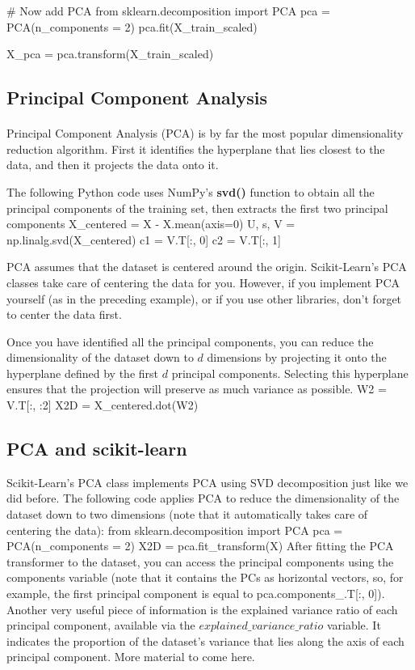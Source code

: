 \documentclass[%
oneside,                 %
final,                   %
10pt]{article}
\begin{document}
\bpycod
# Now add PCA
from sklearn.decomposition import PCA
pca = PCA(n_components = 2)
pca.fit(X_train_scaled)

X_pca = pca.transform(X_train_scaled)
\epycod



\subsection{Principal Component Analysis}

\paragraph{}
Principal Component Analysis (PCA) is by far the most popular dimensionality reduction algorithm.
First it identifies the hyperplane that lies closest to the data, and then it projects the data onto it.

The following Python code uses NumPy’s \textbf{svd()} function to obtain all the principal components of the
training set, then extracts the first two principal components
\bpycod
X_centered = X - X.mean(axis=0)
U, s, V = np.linalg.svd(X_centered)
c1 = V.T[:, 0]
c2 = V.T[:, 1]
\epycod

PCA assumes that the dataset is centered around the origin. Scikit-Learn’s PCA classes take care of centering
the data for you. However, if you implement PCA yourself (as in the preceding example), or if you use other libraries, don’t
forget to center the data first.

Once you have identified all the principal components, you can reduce the dimensionality of the dataset
down to $d$ dimensions by projecting it onto the hyperplane defined by the first $d$ principal components.
Selecting this hyperplane ensures that the projection will preserve as much variance as possible. 
\bpycod
W2 = V.T[:, :2]
X2D = X_centered.dot(W2)
\epycod

\subsection{PCA and scikit-learn}

Scikit-Learn’s PCA class implements PCA using SVD decomposition just like we did before. The
following code applies PCA to reduce the dimensionality of the dataset down to two dimensions (note
that it automatically takes care of centering the data):
\bpycod
from sklearn.decomposition import PCA
pca = PCA(n_components = 2)
X2D = pca.fit_transform(X)
\epycod
After fitting the PCA transformer to the dataset, you can access the principal components using the
components variable (note that it contains the PCs as horizontal vectors, so, for example, the first
principal component is equal to 
\bpycod
pca.components_.T[:, 0]).
\epycod
Another very useful piece of information is the explained variance ratio of each principal component,
available via the $explained\_variance\_ratio$ variable. It indicates the proportion of the dataset’s
variance that lies along the axis of each principal component. 
More material to come here.
\end{document}
